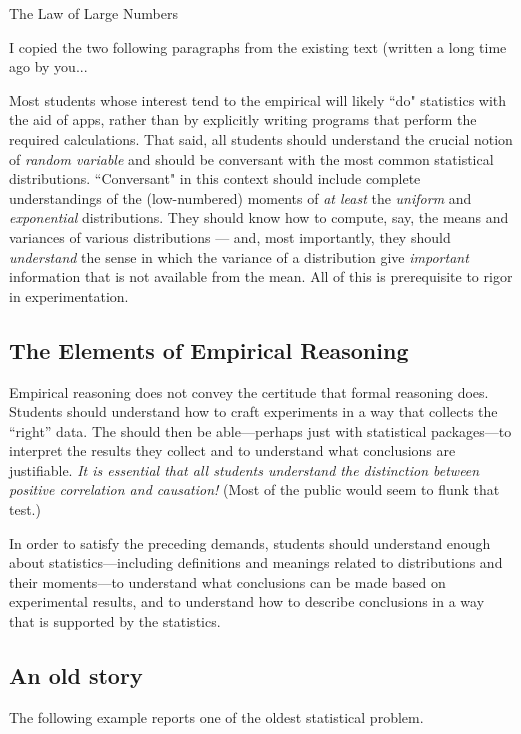 The Law of Large Numbers


{\Denis I copied the two following paragraphs from the existing text (written a long time ago by you...}

Most students whose interest tend to the empirical will likely ``do"
statistics with the aid of apps, rather than by explicitly writing
programs that perform the required calculations.  That said, all
students should understand the crucial notion of {\em random variable}
and should be conversant with the most common statistical
distributions.  ``Conversant" in this context should include complete
understandings of the (low-numbered) moments of {\em at least} the
{\em uniform} and {\em exponential} distributions.  They should know
how to compute, say, the means and variances of various distributions
— and, most importantly, they should {\em understand} the sense in
which the variance of a distribution give {\em important} information
that is not available from the mean.  All of this is prerequisite to
rigor in experimentation.

\subsection{The Elements of Empirical Reasoning}

Empirical reasoning does not convey the certitude that formal
reasoning does.  Students should understand how to craft experiments
in a way that collects the ``right'' data.  The should then be
able---perhaps just with statistical packages---to interpret the
results they collect and to understand what conclusions are
justifiable.  {\em It is essential that all students understand the                  
  distinction between {\em positive correlation} and {\em causation}!}
(Most of the public would seem to flunk that test.)

In order to satisfy the preceding demands, students should understand
enough about statistics---including definitions and meanings related
to distributions and their moments---to understand what conclusions
can be made based on experimental results, and to understand how to
describe conclusions in a way that is supported by the statistics.


\subsection{An old story}

The following example reports one of the oldest statistical problem.

